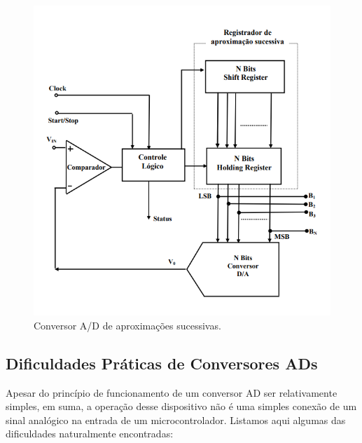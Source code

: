 		\begin{figure}[!ht]
			\centering
				\includegraphics[scale=0.5]{./figuras/aprox-sucessivas-conv-ad.png}
				\caption{Conversor A/D de aproximações sucessivas.}
				\label{conv-aprox-sucessivas1}
		\end{figure}
	
	\subsection{Dificuldades Práticas de Conversores ADs}
		
		Apesar do princípio de funcionamento de um conversor AD ser relativamente simples, em suma, a operação desse dispositivo não é uma simples conexão de um sinal analógico na entrada de um microcontrolador. Listamos aqui algumas das dificuldades naturalmente encontradas:
		
